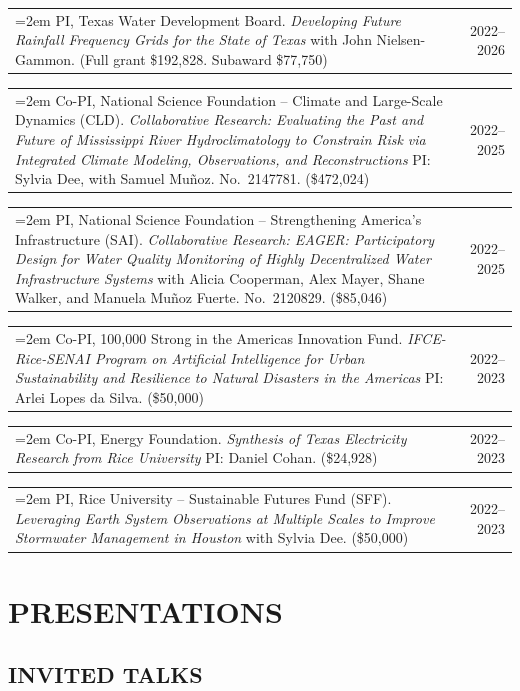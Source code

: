 \documentclass[10pt,oneside]{article}
\makeatletter
\newenvironment{alignedentrieshang}[1][2em]{%
  \noindent%
}{%
}
\newcommand{\hangingitem}[2]{%
  \noindent%
  \begin{tabular*}{\textwidth}{@{}p{0.85\textwidth}@{\extracolsep{\fill}}r@{}}%
    \hangindent=2em \hangafter=1 #1 & #2%
  \end{tabular*}%
}
\makeatother
\begin{document}
\begin{alignedentrieshang}
\hangingitem{PI, Texas Water Development Board. \textit{Developing Future Rainfall Frequency Grids for the State of Texas} with John Nielsen-Gammon. (Full grant \$192,828. Subaward \$77,750)}{2022--2026}


\hangingitem{Co-PI, National Science Foundation -- Climate and Large-Scale Dynamics (CLD). \textit{Collaborative Research: Evaluating the Past and Future of Mississippi River Hydroclimatology to Constrain Risk via Integrated Climate Modeling, Observations, and Reconstructions} PI: Sylvia Dee, with Samuel Muñoz. No.\ 2147781. (\$472,024)}{2022--2025}


\hangingitem{PI, National Science Foundation -- Strengthening America's Infrastructure (SAI). \textit{Collaborative Research: EAGER: Participatory Design for Water Quality Monitoring of Highly Decentralized Water Infrastructure Systems} with Alicia Cooperman, Alex Mayer, Shane Walker, and Manuela Muñoz Fuerte. No.\ 2120829. (\$85,046)}{2022--2025}


\hangingitem{Co-PI, 100,000 Strong in the Americas Innovation Fund. \textit{IFCE-Rice-SENAI Program on Artificial Intelligence for Urban Sustainability and Resilience to Natural Disasters in the Americas} PI: Arlei Lopes da Silva. (\$50,000)}{2022--2023}


\hangingitem{Co-PI, Energy Foundation. \textit{Synthesis of Texas Electricity Research from Rice University} PI: Daniel Cohan. (\$24,928)}{2022--2023}


\hangingitem{PI, Rice University -- Sustainable Futures Fund (SFF). \textit{Leveraging Earth System Observations at Multiple Scales to Improve Stormwater Management in Houston} with Sylvia Dee. (\$50,000)}{2022--2023}

\end{alignedentrieshang}
\section{PRESENTATIONS}

\subsection{INVITED TALKS}
\end{document}
